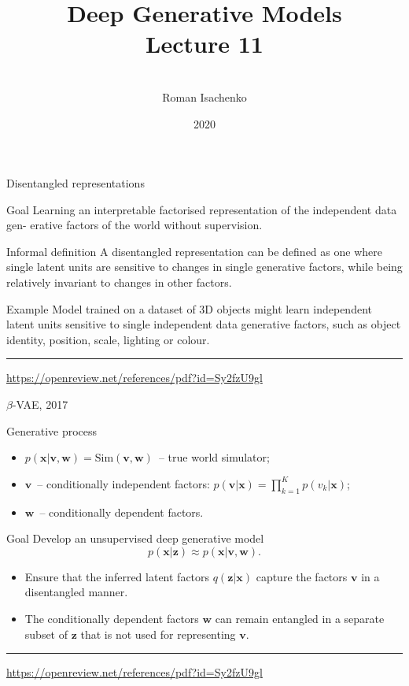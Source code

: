 \documentclass{beamer}
\title[\hbox to 56mm{Deep Generative Models  \hfill\insertframenumber\,/\,\inserttotalframenumber}]
{Deep Generative Models \\ Lecture 11}
\author[Roman Isachenko]{\\Roman Isachenko}
\institute[MIPT]{Moscow Institute of Physics and Technology \\
}
\date{2020}
\newcommand{\bv}{\mathbf{v}}
\newcommand{\bw}{\mathbf{w}}
\newcommand{\bx}{\mathbf{x}}
\newcommand{\bz}{\mathbf{z}}
\begin{document}
\begin{frame}
\titlepage
\end{frame}
\begin{frame}{Disentangled representations}
\begin{block}{Goal}
    Learning an interpretable factorised representation of the independent data gen- erative factors of the world without supervision. 
\end{block}
\begin{block}{Informal definition}
A disentangled representation can be defined as one where single latent units are sensitive to changes in single generative factors, while being relatively invariant to changes in other factors. 
\end{block}
\begin{block}{Example}
Model trained on a dataset of 3D objects might learn independent latent units sensitive to single independent data generative factors, such as object identity, position, scale, lighting or colour. 
\end{block}
\vfill
\hrule\medskip
{\scriptsize \href{https://openreview.net/references/pdf?id=Sy2fzU9gl}{https://openreview.net/references/pdf?id=Sy2fzU9gl}}
\end{frame}
\begin{frame}{$\beta$-VAE, 2017}
\begin{block}{Generative process}
\begin{itemize}
    \item $p(\bx | \bv, \bw) = \text{Sim}(\bv, \bw)$~-- true world simulator;
    \item $\bv$~-- conditionally independent factors: $p(\bv | \bx) = \prod_{k=1}^K p(v_k | \bx)$;
    \item $\bw$~-- conditionally dependent factors. 
\end{itemize}
\end{block}
\begin{block}{Goal}
Develop an unsupervised deep generative model
\[
    p(\bx | \bz) \approx p(\bx | \bv, \bw).
\]
\vspace{-0.5cm}
\begin{itemize}
    \item Ensure that the inferred latent factors $q(\bz|\bx)$ capture the factors $\bv$ in a disentangled manner. 
    \item The conditionally dependent factors $\bw$ can remain entangled in a separate subset of $\bz$ that is not used for representing $\bv$. 
\end{itemize}
\end{block}
\vfill
\hrule\medskip
{\scriptsize \href{https://openreview.net/references/pdf?id=Sy2fzU9gl}{https://openreview.net/references/pdf?id=Sy2fzU9gl}}
\end{frame}
\end{document}

